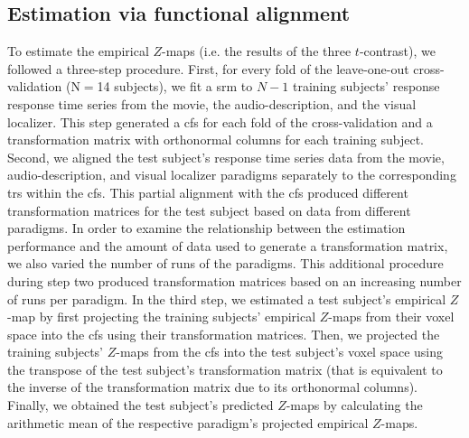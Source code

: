 \subsection{Estimation via functional alignment}
%
To estimate the empirical $Z$-maps (i.e. the results of the three $t$-contrast),
we followed a three-step procedure.
First, for every fold of the leave-one-out cross-validation (N$=$14 subjects),
we fit a \ac{srm} to $N-1$ training subjects' response response time series from
the movie, the audio-description, and the visual localizer.
This step generated a \ac{cfs} for each fold of the cross-validation and a
transformation matrix with orthonormal columns for each training subject.
Second, we aligned the test subject's response time series data from the movie,
audio-description, and visual localizer paradigms separately to the
corresponding \acp{tr} within the \ac{cfs}.
%
This partial alignment with the \ac{cfs} produced different transformation
matrices for the test subject based on data from different paradigms.
In order to examine the relationship between the estimation performance and the
amount of data used to generate a transformation matrix, we also varied the
number of runs of the paradigms.
%
This additional procedure during step two produced transformation matrices based
on an increasing number of runs per paradigm.
%
In the third step, we estimated a test subject's empirical $Z$-map by first
projecting the training subjects' empirical $Z$-maps from their voxel space into
the \ac{cfs} using their transformation matrices.
Then, we projected the training subjects' $Z$-maps from the \ac{cfs} into the
test subject's voxel space using the transpose of the test subject's
transformation matrix (that is equivalent to the inverse of the transformation
matrix due to its orthonormal columns).
Finally, we obtained the test subject's predicted $Z$-maps by calculating the
arithmetic mean of the respective paradigm's projected empirical $Z$-maps.



